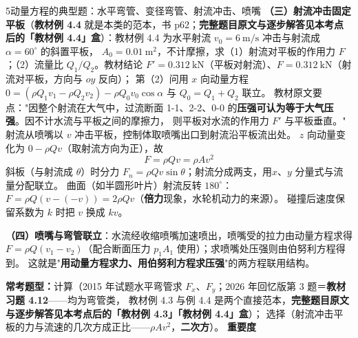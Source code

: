 \begin{kaodian}{5}{动量方程的典型题：水平弯管、变径弯管、射流冲击、喷嘴}
\textbf{（三）射流冲击固定平板}（\textbf{教材例 4.4} 就是本类的范本，书 p62；\textbf{完整题目原文与逐步解答见本考点后的「教材例 4.4」盒}）：教材例 4.4 为水平射流 $v_0=6\ \mathrm{m/s}$ 冲击与射流成 $\alpha=60^{\circ}$ 的斜置平板，
$A_0=0.01\ \mathrm{m^2}$，不计摩擦，求（1）射流对平板的作用力 $F$；（2）流量比 $Q_1/Q_2$。教材结论 $F'=0.312\ \mathrm{kN}$（平板对射流）、$F=0.312\ \mathrm{kN}$（射流对平板，方向与 $oy$ 反向）；
第（2）问用 $x$ 向动量方程 $0=(\rho Q_1v_1-\rho Q_2v_2)-\rho Q_0v_0\cos\alpha$ 与 $Q_0=Q_1+Q_2$ 联立。
教材原文要点："因整个射流在大气中，过流断面 1-1、2-2、0-0 的\textbf{压强可认为等于大气压强}。因不计水流与平板之间的摩擦力，
则平板对水流的作用力 $F'$ 与平板垂直。"\\
射流从喷嘴以 $v$ 冲击平板，控制体取喷嘴出口到射流沿平板流出处。
$z$ 向动量变化为 $0-\rho Qv$（取射流方向为正），故
\[ F=\rho Qv=\rho A v^2 \]
斜板（与射流成 $\theta$）时分力 $F_n=\rho Qv\sin\theta$；射流分成两支，用$x$、$y$ 分量式与流量分配联立。
曲面（如半圆形叶片）射流反转 $180^\circ$：$F=\rho Q(v-(-v))=2\rho Qv$（\textbf{倍力}现象，水轮机动力的来源）。
碰撞后速度保留系数为 $k$ 时把 $v$ 换成 $kv$。

\textbf{（四）喷嘴与弯管联立}：水流经收缩喷嘴加速喷出，喷嘴受的拉力由动量方程求得
$F=\rho Q(v_1-v_2)$（配合断面压力 $p_1A_1$ 使用）；求喷嘴处压强则由伯努利方程得到。
这就是"\textbf{用动量方程求力、用伯努利方程求压强}"的两方程联用结构。

\textbf{常考题型：}计算（2015 年试题水平弯管求 $F_x$、$F_y$；2026 年回忆版第 3 题＝\textbf{教材习题 4.12}——均为弯管类，
教材例 4.3 与例 4.4 是两个直接范本，\textbf{完整题目原文与逐步解答见本考点后的「教材例 4.3」「教材例 4.4」盒}）；
选择（射流冲击平板的力与流速的几次方成正比——$\rho Av^2$，\textbf{二次方}）。
\textbf{重要度 }\quad{}\quad{}


\end{kaodian}
